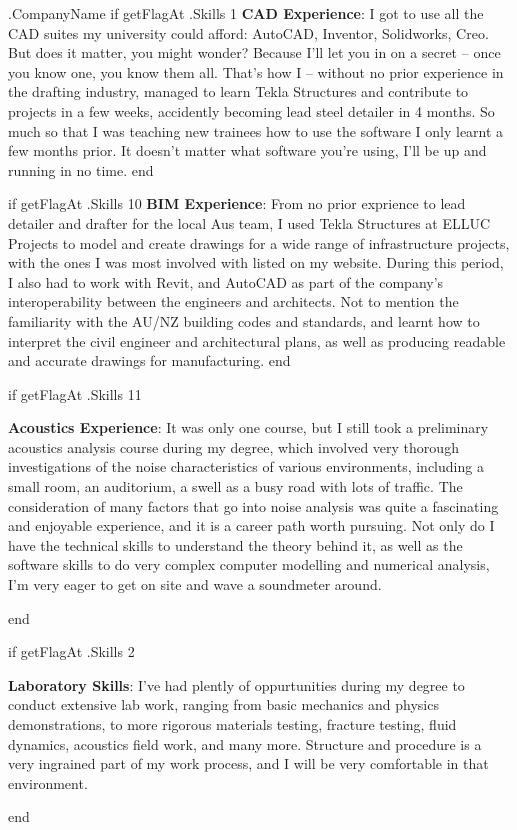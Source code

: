 \documentclass[10pt]{letter}
\begin{document}
\begin{letter}{
    {{ .CompanyName }}
}
{{ if getFlagAt .Skills 1 }}
\textbf{CAD Experience}: I got to use all the CAD suites my university could afford: AutoCAD, Inventor, Solidworks, Creo. But does it matter, you might wonder? Because I'll let you in on a secret -- once you know one, you know them all. That's how I -- without no prior experience in the drafting industry, managed to learn Tekla Structures and contribute to projects in a few weeks, accidently becoming lead steel detailer in 4 months. So much so that I was teaching new trainees how to use the software I only learnt a few months prior. It doesn't matter what software you're using, I'll be up and running in no time. 
{{ end }}

{{ if getFlagAt .Skills 10 }}
\textbf{BIM Experience}: From no prior exprience to lead detailer and drafter for the local Aus team, I used Tekla Structures at ELLUC Projects to model and create drawings for a wide range of infrastructure projects, with the ones I was most involved with listed on my website. During this period, I also had to work with Revit, and AutoCAD as part of the company's interoperability between the engineers and architects. Not to mention the familiarity with the AU/NZ building codes and standards, and learnt how to interpret the civil engineer and architectural plans, as well as producing readable and accurate drawings for manufacturing. 
{{ end }}

{{ if getFlagAt .Skills 11 }}
\begin{minipage}{\linewidth}
\textbf{Acoustics Experience}: It was only one course, but I still took a preliminary acoustics analysis course during my degree, which involved very thorough investigations of the noise characteristics of various environments, including a small room, an auditorium, a swell as a busy road with lots of traffic. The consideration of many factors that go into noise analysis was quite a fascinating and enjoyable experience, and it is a career path worth pursuing. Not only do I have the technical skills to understand the theory behind it, as well as the software skills to do very complex computer modelling and numerical analysis, I'm very eager to get on site and wave a soundmeter around. 
\end{minipage}
{{ end }}

{{ if getFlagAt .Skills 2 }}
\begin{minipage}{\linewidth}
\textbf{Laboratory Skills}: I've had plently of oppurtunities during my degree to conduct extensive lab work, ranging from basic mechanics and physics demonstrations, to more rigorous materials testing, fracture testing, fluid dynamics, acoustics field work, and many more. Structure and procedure is a very ingrained part of my work process, and I will be very comfortable in that environment. 
\end{minipage}
{{ end }}


\end{letter}
\end{document}
